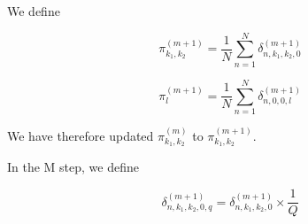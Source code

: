 \documentclass[11pt,authoryear]{article}
\begin{document}
We define 

$$ \pi^{(m+1)}_{k_1, k_2} = \frac{1}{N}\sum_{n=1}^{N} \delta^{(m+1)}_{n, k_1, k_2, 0} $$

$$ \pi^{(m+1)}_{l} = \frac{1}{N}\sum_{n=1}^{N} \delta^{(m+1)}_{n, 0, 0, l} $$

We have therefore updated $\pi^{(m)}_{k_1, k_2}$ to $\pi^{(m+1)}_{k_1, k_2}$.

In the M step, we define 

$$ \delta^{(m+1)}_{n, k_1, k_2, 0, q} =  \delta^{(m+1)}_{n, k_1, k_2, 0} \times \frac{1}{Q}  $$ 


%
%
%
%
%
%
%
%
%
%
%
%
%
\end{document}
